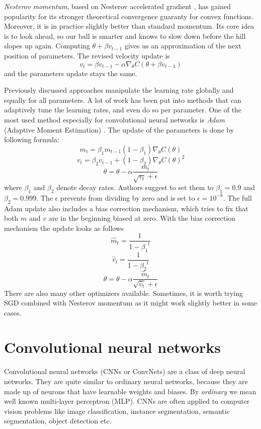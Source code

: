 \textit{Nesterov momentum}, based on Nesterov accelerated gradient
\cite{bib:nesterov1983convex}, has gained popularity for its stronger theoretical
convergence guaranty for convex functions. Moreover, it is in practice slightly better than
standard momentum. Its core idea is to look ahead, so our ball is smarter and knows
to slow down before the hill slopes up again. Computing $\theta + \beta v_{t-1}$
gives us an approximation of the next position of parameters. The revised velocity
update is
$$v_t = \beta v_{t-1} - \alpha\nabla_{\theta} C(\theta + \beta v_{t-1})$$
and the parameters update stays the same.

Previously discussed approaches manipulate the learning rate globally and equally for all
parameters. A lot of work has been put into methods that can adaptively tune the learning
rates, and even do so per parameter.
One of the most used method especially for convolutional neural networks is
\textit{Adam} (Adaptive Moment Estimation) \cite{bib:kingma2014adam}. The update of
the parameters is done by following formula:
$$m_t = \beta_1 m_{t-1}(1-\beta_1)\nabla_{\theta} C(\theta)$$
$$v_t = \beta_2 v_{t-1} + (1-\beta_2)\nabla_{\theta} C(\theta)^2$$
$$\theta = \theta - \alpha \frac{m_t}{\sqrt{v_t} + \epsilon}$$
where $\beta_1$ and $\beta_2$ denote decay rates. Authors suggest to set them to
$\beta_1 = 0.9$ and $\beta_2 = 0.999$.
The $\epsilon$ prevents from dividing by zero and is set to $\epsilon = 10^{-8}$.
The full Adam update also includes a bias correction mechanism, which tries to fix
that both $m$ and $v$ are in the beginning biased at zero. With the bias correction mechanism
the update looks as follows
$$\hat{m}_t = \frac{1}{1-{\beta_1}^t}$$
$$\hat{v}_t = \frac{1}{1-{\beta_2}^t}$$
$$\theta = \theta - \alpha \frac{\hat{m}_t}{\sqrt{\hat{v}_t} + \epsilon}$$
There are also many other optimizers available. Sometimes, it is worth trying SGD
combined with Nesterov momentum as it might work slightly better in some cases.
\cite{bib:cnncs231n}

\section{Convolutional neural networks}
\label{sec:cnn}

Convolutional neural networks (CNNs or ConvNets) are a class of deep neural networks.
They are quite similar to ordinary neural networks, because they are made up of
neurons that have learnable weights and biases. By \textit{ordinary} we mean well known
multi-layer perceptron (MLP). CNNs are often applied to computer vision problems like
image classification, instance segmentation, semantic segmentation, object detection etc.

